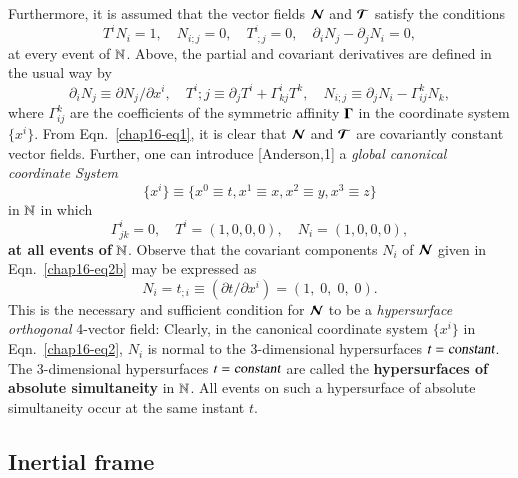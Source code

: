 Furthermore, it is  assumed that the vector fields $\bm{\mathcal{N}}$ and $\bm{\mathcal{T}}$ satisfy the conditions 
\setcounter{equation}{0}
\begin{equation}
T^i N_i =1,\quad  N_{i;j}=0, \quad  T^i_{\;;j}=0, \quad  \partial_i  N_j - \partial_j N_i=0,\label{chap16-eq1} 
\end{equation}
at every event of $\mathbb{N}$. Above,  the partial  and covariant derivatives are defined in the usual way by
\begin{equation*}
\partial_i  N_j\equiv \partial N_j/\partial x^i,\quad T^i;j\equiv\partial_j  T^i+\Gamma^i_{kj} T^k,\quad N_{i;j}\equiv\partial_j  N_i-\Gamma^k_{ij} N_k,
\end{equation*}
where $\Gamma^k_{ij}$ are the coefficients of the symmetric affinity $\mathbf{\Gamma}$ in the coordinate system $\{x^i\}$. From Eqn.~\eqref{chap16-eq1}, it is clear that $\bm{\mathcal{N}}$ and $\bm{\mathcal{T}}$ are covariantly constant vector fields. Further, one can introduce [Anderson,1] a \textsl{global canonical coordinate System} 
\begin{equation}
\{x^i\}\equiv \{x^0\equiv t, x^1\equiv x,x^2\equiv y,x^3\equiv z\} \label{chap16-eq2}
\end{equation}
in  $\mathbb{N}$  in which 
\begin{equation*}
\Gamma^i_{jk}=0, \quad T^i=(1,0,0,0),\quad N_i=(1,0,0,0),\tag{2b}\label{chap16-eq2b}
\end{equation*}
\textbf{at all events of} $\mathbb{N}$. Observe that the covariant components $N_i$ of $\bm{\mathcal{N}}$ given in Eqn.~\eqref{chap16-eq2b} may be expressed as  
\begin{equation*}
N_i=t_{;i} \equiv (\partial t/\partial x^i)=(1,\;0,\;0,\;0).\tag{2c}\label{chap16-eq2c}
\end{equation*}
This is the necessary and sufficient condition for $\bm{\mathcal{N}}$ to be  a \textsl{hypersurface orthogonal} 4-vector field: Clearly, in the canonical coordinate system $\{x^i\}$  in Eqn.~\eqref{chap16-eq2}, $N_i$ is normal to the 3-dimensional hypersurfaces $t=\textsl{constant}$. The 3-dimensional hypersurfaces  $t=\textsl{constant}$  are called the \textbf{hypersurfaces of absolute simultaneity} in $\mathbb{N}$. All events on such a hypersurface of absolute simultaneity occur at the same instant $t$. 

\subsection*{Inertial frame}\label{chap16-sec2.1}

